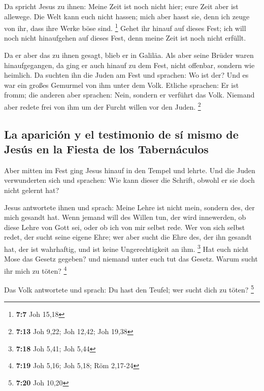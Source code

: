  Da spricht Jesus zu ihnen: Meine Zeit ist noch nicht
hier; eure Zeit aber ist allewege.  Die Welt kann euch
nicht hassen; mich aber hasst sie, denn ich zeuge von ihr, dass ihre
Werke böse sind. \footnote{\textbf{7:7} Joh 15,18}  Gehet
ihr hinauf auf dieses Fest; ich will noch nicht hinaufgehen auf dieses
Fest, denn meine Zeit ist noch nicht erfüllt.

 Da er aber das zu ihnen gesagt, blieb er in Galiläa.
 Als aber seine Brüder waren hinaufgegangen, da ging er
auch hinauf zu dem Fest, nicht offenbar, sondern wie heimlich.
 Da suchten ihn die Juden am Fest und sprachen: Wo ist
der?  Und es war ein großes Gemurmel von ihm unter dem
Volk. Etliche sprachen: Er ist fromm; die anderen aber sprachen: Nein,
sondern er verführt das Volk.  Niemand aber redete frei
von ihm um der Furcht willen vor den Juden. \footnote{\textbf{7:13} Joh
  9,22; Joh 12,42; Joh 19,38}

\hypertarget{la-apariciuxf3n-y-el-testimonio-de-suxed-mismo-de-jesuxfas-en-la-fiesta-de-los-tabernuxe1culos}{%
\subsection{La aparición y el testimonio de sí mismo de Jesús en la
Fiesta de los
Tabernáculos}\label{la-apariciuxf3n-y-el-testimonio-de-suxed-mismo-de-jesuxfas-en-la-fiesta-de-los-tabernuxe1culos}}

 Aber mitten im Fest ging Jesus hinauf in den Tempel und
lehrte.  Und die Juden verwunderten sich und sprachen:
Wie kann dieser die Schrift, obwohl er sie doch nicht gelernt hat?

 Jesus antwortete ihnen und sprach: Meine Lehre ist nicht
mein, sondern des, der mich gesandt hat.  Wenn jemand
will des Willen tun, der wird innewerden, ob diese Lehre von Gott sei,
oder ob ich von mir selbst rede.  Wer von sich selbst
redet, der sucht seine eigene Ehre; wer aber sucht die Ehre des, der ihn
gesandt hat, der ist wahrhaftig, und ist keine Ungerechtigkeit an ihm.
\footnote{\textbf{7:18} Joh 5,41; Joh 5,44}  Hat euch
nicht Mose das Gesetz gegeben? und niemand unter euch tut das Gesetz.
Warum sucht ihr mich zu töten? \footnote{\textbf{7:19} Joh 5,16; Joh
  5,18; Röm 2,17-24}

 Das Volk antwortete und sprach: Du hast den Teufel; wer
sucht dich zu töten? \footnote{\textbf{7:20} Joh 10,20}

